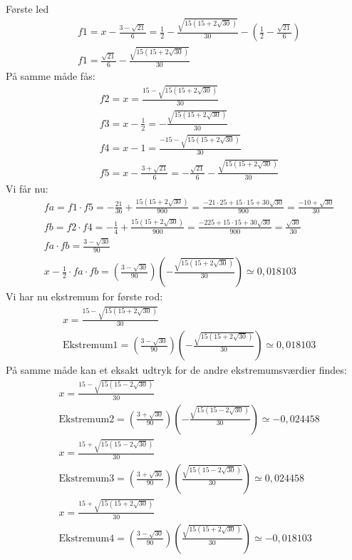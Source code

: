 Første led
\begin{align*}
&f1=x- \tfrac{3-\sqrt{21}}{6}=\tfrac{1}{2}-\tfrac{\sqrt{15(15+2\sqrt{30})}}{30}
-(\tfrac{1}{2}-\tfrac{\sqrt{21}}{6})\\
&f1=\tfrac{\sqrt{21}}{6}-\tfrac{\sqrt{15(15+2\sqrt{30})}}{30}
\end{align*}
På samme måde fås:
\begin{align*}
&f2=x=\tfrac{15 - \sqrt{15(15+2\sqrt{30})}}{30}\\
&f3=x-\tfrac{1}{2}=-\frac{\sqrt{15(15+2\sqrt{30})}}{30}\\
&f4=x-1=\tfrac{-15 - \sqrt{15(15+2\sqrt{30})}}{30}\\
&f5=x-\tfrac{3+\sqrt{21}}{6}=-\tfrac{\sqrt{21}}{6}-\tfrac{\sqrt{15(15+2\sqrt{30})}}{30}
\end{align*}
Vi får nu:
\begin{align*}
&fa=f1 \cdot f5 = -\tfrac{21}{36}+\tfrac{15(15+2\sqrt{30})}{900}=\tfrac{-21 \cdot 25+15 \cdot 15+30\sqrt{30}}{900}=\tfrac{-10+\sqrt{30}}{30}\\
&fb=f2 \cdot f4 =-\tfrac{1}{4}+\tfrac{15(15+2\sqrt{30})}{900}=\tfrac{-225+15 \cdot 15+30\sqrt{30}}{900}=\tfrac{\sqrt{30}}{30}\\
&fa \cdot fb=\tfrac{3-\sqrt{30}}{90}\\
&x-\tfrac{1}{2} \cdot fa \cdot fb =(\tfrac{3-\sqrt{30}}{90})(-\tfrac{\sqrt{15(15+2\sqrt{30})}}{30}) \simeq 0,018103
\end{align*}
Vi har nu ekstremum for første rod:
\begin{align*}
&x=\tfrac{15 - \sqrt{15(15+2\sqrt{30})}}{30}\\
&\text{Ekstremum1}=(\tfrac{3-\sqrt{30}}{90})(-\tfrac{\sqrt{15(15+2\sqrt{30})}}{30}) \simeq 0,018103
\end{align*}
På samme måde kan et eksakt udtryk for de andre ekstremumsværdier findes:
\begin{align*}
&x=\tfrac{15 - \sqrt{15(15-2\sqrt{30})}}{30}\\
&\text{Ekstremum2}=(\tfrac{3+\sqrt{30}}{90})(-\tfrac{\sqrt{15(15-2\sqrt{30})}}{30}) \simeq -0,024458\\
&x=\tfrac{15 + \sqrt{15(15-2\sqrt{30})}}{30}\\
&\text{Ekstremum3}=(\tfrac{3+\sqrt{30}}{90})(\tfrac{\sqrt{15(15-2\sqrt{30})}}{30}) \simeq 0,024458\\
&x=\tfrac{15 + \sqrt{15(15+2\sqrt{30})}}{30}\\
&\text{Ekstremum4}=(\tfrac{3-\sqrt{30}}{90})(\tfrac{\sqrt{15(15+2\sqrt{30})}}{30}) \simeq -0,018103
\end{align*}

